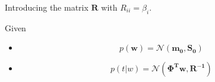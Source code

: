 \documentclass{amsart}
\begin{document}
\begin{enumerate}[label=\textbf{(\Roman*)}]
        Introducing the matrix \(\mathbf{R}\) with \(R_{ii} = \beta_i\).




        



        Given \begin{itemize}
            \item \[p(\mathbf{w}) = \mathcal{N}(\mathbf{m_0, S_0})\]
            \item \[p(t|w) = \mathcal{N}(\mathbf{\Phi^T w, R^{-1}})\]
        \end{itemize}


\end{enumerate}
\end{document}
